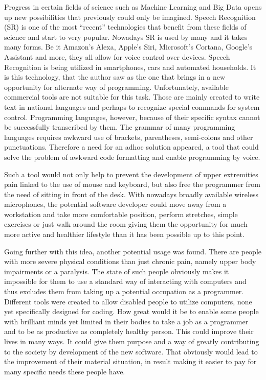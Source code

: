 Progress in certain fields of science such as Machine Learning and Big Data opens up new possibilities that previously could only be imagined. Speech Recognition (SR) is one of the most ``recent'' technologies that benefit from these fields of science and start to very popular. Nowadays SR is used by many and it takes many forms. Be it Amazon's Alexa, Apple's Siri, Microsoft's Cortana, Google's Assistant and more, they all allow for voice control over devices. Speech Recognition is being utilized in smartphones, cars and automated households. It is this technology, that the author saw as the one that brings in 
a new opportunity for alternate way of programming. Unfortunately, available commercial tools are not suitable for this task. Those are mainly created to write text in national languages and perhaps to recognize special commands for system control. Programming languages, however, because of their specific syntax cannot be successfully transcribed by them. The grammar of many programming languages requires awkward use of brackets, parentheses, semi-colons and other punctuations. Therefore a need for an adhoc solution appeared, a tool that could solve the problem of awkward code formatting and enable programming by voice.

Such a tool would not only help to prevent the development of upper extremities pain linked to the use of mouse and keyboard, but also free the programmer from the need of sitting in front of the desk. With nowadays broadly available wireless microphones, the potential software developer could move away from a workstation and take more comfortable position, perform stretches, simple exercises or just walk around the room giving them the opportunity for much more active and healthier lifestyle than it has been possible up to this point. 

Going further with this idea, another potential usage was found. There are people with more severe physical conditions than just chronic pain, namely upper body impairments or a paralysis. The state of such people obviously makes it impossible for them to use a standard way of interacting with computers and thus excludes them from taking up a potential occupation as a programmer. Different tools were created to allow disabled people to utilize computers, none yet specifically designed for coding. How great would it be to enable some people with brilliant minds yet  limited in their bodies to take a job as a programmer and to be as productive as completely healthy person. This could improve their lives in many ways. It could give them purpose and a way of greatly contributing to the society by development of the new software. That obviously would lead to the improvement of their material situation, in result making it easier to pay for many specific needs these people have. 

